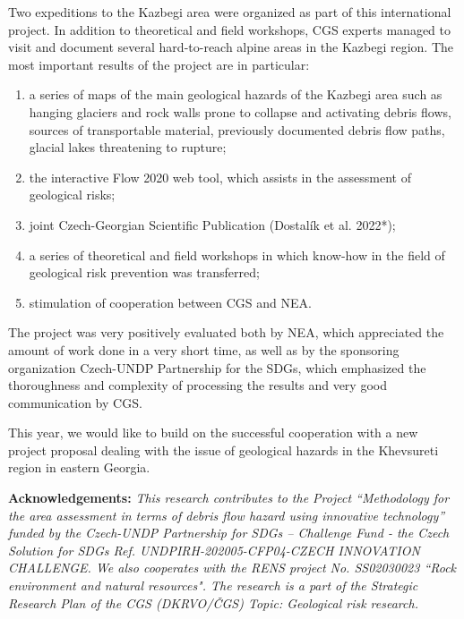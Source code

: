 {Two expeditions to the Kazbegi area were organized as part of this international project. In addition to theoretical and field workshops, CGS experts managed to visit and document several hard-to-reach alpine areas in the Kazbegi region. The most important results of the project are in particular:
\begin{enumerate}
\item  a series of maps of the main geological hazards of the Kazbegi area such as hanging glaciers and rock walls prone to collapse and activating debris flows, sources of transportable material, previously documented debris flow paths, glacial lakes threatening to rupture;
\item the interactive Flow 2020 web tool, which assists in the assessment of geological risks;
\item joint Czech-Georgian Scientific Publication (Dostalík et al. 2022*);
\item a series of theoretical and field workshops in which know-how in the field of geological risk prevention was transferred;
\item stimulation of cooperation between CGS and NEA.
\end{enumerate}	

The project was very positively evaluated both by NEA, which appreciated the amount of work done in a very short time, as well as by the sponsoring organization Czech-UNDP Partnership for the SDGs, which emphasized the thoroughness and complexity of processing the results and very good communication by CGS. 

This year, we would like to build on the successful cooperation with a new project proposal dealing with the issue of geological hazards in the Khevsureti region in eastern Georgia.


\vspace{0.5em}
\noindent
\textbf{Acknowledgements:}
\textit{This research contributes to the Project “Methodology for the area assessment in terms of debris flow hazard using innovative technology” funded by the Czech-UNDP Partnership for SDGs – Challenge Fund - the Czech Solution for SDGs Ref. UNDPIRH-202005-CFP04-CZECH INNOVATION CHALLENGE. 
We also cooperates with the RENS project No. SS02030023 “Rock environment and natural resources".
The research is a part of the Strategic Research Plan of the CGS (DKRVO/ČGS) Topic: Geological risk research.}
}
